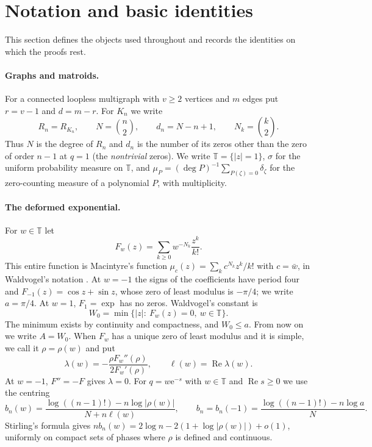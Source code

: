 \documentclass[11pt,a4paper]{article}
\theoremstyle{remark}
\newcommand{\T}{\mathbb T}
\newcommand{\e}{\mathrm e}
\newcommand{\Rea}{\operatorname{Re}}
\begin{document}
\section{Notation and basic identities}\label{sec:notation}
This section defines the objects used throughout and records the identities on which the proofs rest.

\paragraph{Graphs and matroids.} For a connected loopless multigraph with $v\ge2$ vertices and $m$ edges put $r=v-1$ and $d=m-r$. For $K_n$ we write
\[
R_n=R_{K_n},\qquad N=\binom n2,\qquad d_n=N-n+1,\qquad N_k=\binom k2 .
\]
Thus $N$ is the degree of $R_n$ and $d_n$ is the number of its zeros other than the zero of order $n-1$ at $q=1$ (the \emph{nontrivial} zeros). We write $\T=\{|z|=1\}$, $\sigma$ for the uniform probability measure on $\T$, and $\mu_P=(\deg P)^{-1}\sum_{P(\zeta)=0}\delta_\zeta$ for the zero-counting measure of a polynomial $P$, with multiplicity.

\paragraph{The deformed exponential.} For $w\in\T$ let
\[
F_w(z)=\sum_{k\ge0}w^{-N_k}\frac{z^k}{k!}.
\]
This entire function is Macintyre's function $\mu_c(z)=\sum_kc^{N_k}z^k/k!$ with $c=\bar w$, in Waldvogel's notation \cite{Wald}. At $w=-1$ the signs of the coefficients have period four and $F_{-1}(z)=\cos z+\sin z$, whose zero of least modulus is $-\pi/4$; we write $a=\pi/4$. At $w=1$, $F_1=\exp$ has no zeros. Waldvogel's constant is
\begin{equation}\label{variational}
W_0=\min\{|z|:\ F_w(z)=0,\ w\in\T\}.
\end{equation}
The minimum exists by continuity and compactness, and $W_0\le a$. From now on we write $A=W_0$. When $F_w$ has a unique zero of least modulus and it is simple, we call it $\rho=\rho(w)$ and put
\begin{equation}\label{lambda}
\lambda(w)=-\frac{\rho F_w''(\rho)}{2F_w'(\rho)},\qquad \ell(w)=\Rea\lambda(w).
\end{equation}
At $w=-1$, $F''=-F$ gives $\lambda=0$. For $q=w\e^{-s}$ with $w\in\T$ and $\Rea s\ge0$ we use the centring
\begin{equation}\label{bn}
b_n(w)=\frac{\log((n-1)!)-n\log|\rho(w)|}{N+n\ell(w)},\qquad b_n=b_n(-1)=\frac{\log((n-1)!)-n\log a}{N}.
\end{equation}
Stirling's formula gives $nb_n(w)=2\log n-2(1+\log|\rho(w)|)+o(1)$, uniformly on compact sets of phases where $\rho$ is defined and continuous.
\end{document}
